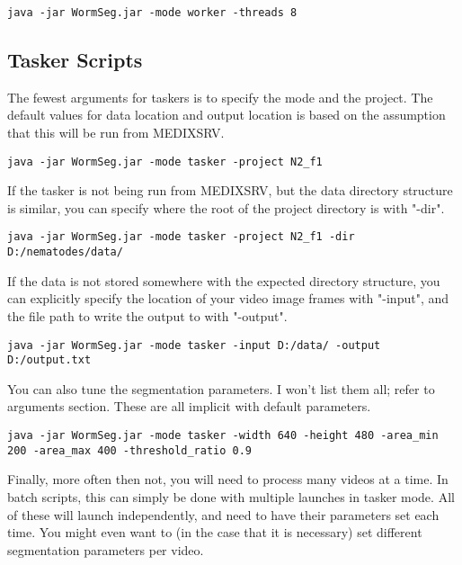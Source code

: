\documentclass[]{article}
\begin{document}
\begin{lstlisting}[language=command.com, breaklines=true, caption=Threads specified]
java -jar WormSeg.jar -mode worker -threads 8
\end{lstlisting}

\subsection{Tasker Scripts}
The fewest arguments for taskers is to specify the mode and the project. The default values for data location and output location is based on the assumption that this will be run from MEDIXSRV.
\begin{lstlisting}[language=command.com, breaklines=true, caption=Project Names]
java -jar WormSeg.jar -mode tasker -project N2_f1
\end{lstlisting}

If the tasker is not being run from MEDIXSRV, but the data directory structure is similar, you can specify where the root of the project directory is with "-dir".
\begin{lstlisting}[language=command.com, breaklines=true, caption=Project + Directory]
java -jar WormSeg.jar -mode tasker -project N2_f1 -dir D:/nematodes/data/
\end{lstlisting}

If the data is not stored somewhere with the expected directory structure, you can explicitly specify the location of your video image frames with "-input", and the file path to write the output to with "-output".
\begin{lstlisting}[language=command.com, breaklines=true, caption=Arbitrary Locations]
java -jar WormSeg.jar -mode tasker -input D:/data/ -output D:/output.txt
\end{lstlisting}

You can also tune the segmentation parameters. I won't list them all; refer to arguments section. These are all implicit with default parameters.
\begin{lstlisting}[language=command.com, breaklines=true, caption=Segmentation Parameters]
java -jar WormSeg.jar -mode tasker -width 640 -height 480 -area_min 200 -area_max 400 -threshold_ratio 0.9
\end{lstlisting}

Finally, more often then not, you will need to process many videos at a time. In batch scripts, this can simply be done with multiple launches in tasker mode. All of these will launch independently, and need to have their parameters set each time. You might even want to (in the case that it is necessary) set different segmentation parameters per video.
\end{document}
